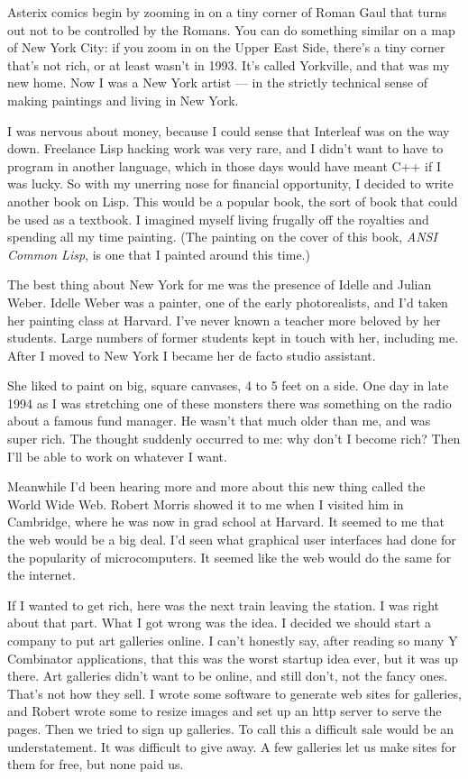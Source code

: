 Asterix comics begin by zooming in on a tiny corner of Roman Gaul that
turns out not to be controlled by the Romans. You can do something
similar on a map of New York City: if you zoom in on the Upper East
Side, there's a tiny corner that's not rich, or at least wasn't in 1993.
It's called Yorkville, and that was my new home. Now I was a New York
artist --- in the strictly technical sense of making paintings and
living in New York.

I was nervous about money, because I could sense that Interleaf was on
the way down. Freelance Lisp hacking work was very rare, and I didn't
want to have to program in another language, which in those days would
have meant C++ if I was lucky. So with my unerring nose for financial
opportunity, I decided to write another book on Lisp. This would be a
popular book, the sort of book that could be used as a textbook. I
imagined myself living frugally off the royalties and spending all my
time painting. (The painting on the cover of this book, \emph{ANSI
Common Lisp}, is one that I painted around this time.)

The best thing about New York for me was the presence of Idelle and
Julian Weber. Idelle Weber was a painter, one of the early
photorealists, and I'd taken her painting class at Harvard. I've never
known a teacher more beloved by her students. Large numbers of former
students kept in touch with her, including me. After I moved to New York
I became her de facto studio assistant.

She liked to paint on big, square canvases, 4 to 5 feet on a side. One
day in late 1994 as I was stretching one of these monsters there was
something on the radio about a famous fund manager. He wasn't that much
older than me, and was super rich. The thought suddenly occurred to me:
why don't I become rich? Then I'll be able to work on whatever I want.

Meanwhile I'd been hearing more and more about this new thing called the
World Wide Web. Robert Morris showed it to me when I visited him in
Cambridge, where he was now in grad school at Harvard. It seemed to me
that the web would be a big deal. I'd seen what graphical user
interfaces had done for the popularity of microcomputers. It seemed like
the web would do the same for the internet.

If I wanted to get rich, here was the next train leaving the station. I
was right about that part. What I got wrong was the idea. I decided we
should start a company to put art galleries online. I can't honestly
say, after reading so many Y Combinator applications, that this was the
worst startup idea ever, but it was up there. Art galleries didn't want
to be online, and still don't, not the fancy ones. That's not how they
sell. I wrote some software to generate web sites for galleries, and
Robert wrote some to resize images and set up an http server to serve
the pages. Then we tried to sign up galleries. To call this a difficult
sale would be an understatement. It was difficult to give away. A few
galleries let us make sites for them for free, but none paid us.

